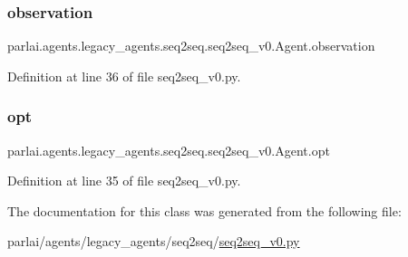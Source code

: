 \subsubsection{\texorpdfstring{observation}{observation}}
{\footnotesize\ttfamily parlai.\+agents.\+legacy\+\_\+agents.\+seq2seq.\+seq2seq\+\_\+v0.\+Agent.\+observation}



Definition at line 36 of file seq2seq\+\_\+v0.\+py.

\mbox{\label{classparlai_1_1agents_1_1legacy__agents_1_1seq2seq_1_1seq2seq__v0_1_1Agent_ae07383697f7232bb21cbd0a1c6e93389}} 
\subsubsection{\texorpdfstring{opt}{opt}}
{\footnotesize\ttfamily parlai.\+agents.\+legacy\+\_\+agents.\+seq2seq.\+seq2seq\+\_\+v0.\+Agent.\+opt}



Definition at line 35 of file seq2seq\+\_\+v0.\+py.



The documentation for this class was generated from the following file\+:\begin{DoxyCompactItemize}
\item 
parlai/agents/legacy\+\_\+agents/seq2seq/\hyperlink{seq2seq__v0_8py}{seq2seq\+\_\+v0.\+py}\end{DoxyCompactItemize}
